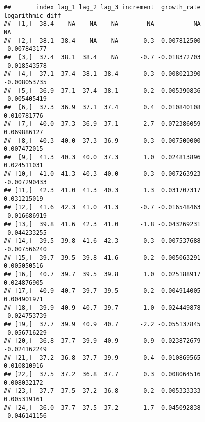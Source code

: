 \documentclass[
]{article}
\newenvironment{Shaded}{\begin{snugshade}}{\end{snugshade}}
\newcommand{\DecValTok}[1]{\textcolor[rgb]{0.00,0.00,0.81}{#1}}
\newcommand{\FunctionTok}[1]{\textcolor[rgb]{0.13,0.29,0.53}{\textbf{#1}}}
\newcommand{\NormalTok}[1]{#1}
\newcommand{\OtherTok}[1]{\textcolor[rgb]{0.56,0.35,0.01}{#1}}
\newcommand{\SpecialCharTok}[1]{\textcolor[rgb]{0.81,0.36,0.00}{\textbf{#1}}}
\begin{document}
\begin{Shaded}
\end{Shaded}

\begin{verbatim}
##       index lag_1 lag_2 lag_3 increment  growth_rate logarithmic_diff
##  [1,]  38.4    NA    NA    NA        NA           NA               NA
##  [2,]  38.1  38.4    NA    NA      -0.3 -0.007812500     -0.007843177
##  [3,]  37.4  38.1  38.4    NA      -0.7 -0.018372703     -0.018543578
##  [4,]  37.1  37.4  38.1  38.4      -0.3 -0.008021390     -0.008053735
##  [5,]  36.9  37.1  37.4  38.1      -0.2 -0.005390836     -0.005405419
##  [6,]  37.3  36.9  37.1  37.4       0.4  0.010840108      0.010781776
##  [7,]  40.0  37.3  36.9  37.1       2.7  0.072386059      0.069886127
##  [8,]  40.3  40.0  37.3  36.9       0.3  0.007500000      0.007472015
##  [9,]  41.3  40.3  40.0  37.3       1.0  0.024813896      0.024511031
## [10,]  41.0  41.3  40.3  40.0      -0.3 -0.007263923     -0.007290433
## [11,]  42.3  41.0  41.3  40.3       1.3  0.031707317      0.031215019
## [12,]  41.6  42.3  41.0  41.3      -0.7 -0.016548463     -0.016686919
## [13,]  39.8  41.6  42.3  41.0      -1.8 -0.043269231     -0.044233255
## [14,]  39.5  39.8  41.6  42.3      -0.3 -0.007537688     -0.007566240
## [15,]  39.7  39.5  39.8  41.6       0.2  0.005063291      0.005050516
## [16,]  40.7  39.7  39.5  39.8       1.0  0.025188917      0.024876905
## [17,]  40.9  40.7  39.7  39.5       0.2  0.004914005      0.004901971
## [18,]  39.9  40.9  40.7  39.7      -1.0 -0.024449878     -0.024753739
## [19,]  37.7  39.9  40.9  40.7      -2.2 -0.055137845     -0.056716229
## [20,]  36.8  37.7  39.9  40.9      -0.9 -0.023872679     -0.024162249
## [21,]  37.2  36.8  37.7  39.9       0.4  0.010869565      0.010810916
## [22,]  37.5  37.2  36.8  37.7       0.3  0.008064516      0.008032172
## [23,]  37.7  37.5  37.2  36.8       0.2  0.005333333      0.005319161
## [24,]  36.0  37.7  37.5  37.2      -1.7 -0.045092838     -0.046141156
\end{verbatim}
\end{document}
